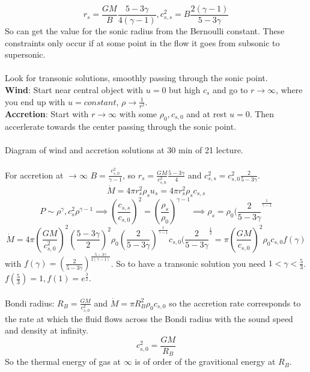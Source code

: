 \documentclass{article}
\begin{document}
$$
r_s = \frac{GM}{B} \frac{5 -3 \gamma}{4(\gamma -1)}, c_{s,s}^2 = B \frac{2(\gamma -1)}{5-3\gamma}
$$
So can get the value for the sonic radius from the Bernoulli constant. These constraints only occur if at some point in the flow it goes from subsonic to supersonic.\\\\
Look for transonic solutions, smoothly passing through the sonic point. \\
\textbf{Wind}: Start near central object with $u=0$ but high $c_s$ and go to $r\rightarrow \infty$, where you end up with $u= constant$, $\rho \rightarrow \frac{1}{r^2}$.\\
\textbf{Accretion}: Start with $r\rightarrow \infty$ with some $\rho_0, c_{s,0}$ and at rest $u=0$. Then accerlerate towards the center passing through the sonic point.\\\\
Diagram of wind and accretion solutions at 30 min of 21 lecture.\\\\
For accretion at $\rightarrow \infty$ $ B= \frac{c_{s,0}^2}{\gamma-1}$, so $r_s = \frac{GM}{c_{s,0}^2} \frac{5-3\gamma}{4}$ and $c^2_{s,s} = c^2_{s,0} \frac{2}{5-3\gamma}$.
$$
\dot M = 4\pi r^2_s \rho_s u_s = 4 \pi r_s^2 \rho_s c_{s,s}
$$
$$
P \sim \rho^{\gamma}, c_s^2 \rho^{\gamma -1} \implies (\frac{c_{s,s}}{c_{s,0}})^2  = (\frac{\rho_s}{\rho_0})^{\gamma -1} \implies \rho_s = \rho_0( \frac{2}{5-3\gamma}^\frac{1}{\gamma -1}
$$
$$
\dot M = 4 \pi (\frac{GM}{c_{s,0}^2})^2 (\frac{5-3\gamma}{2})^2 \rho_0 (\frac{2}{5-3\gamma})^{\frac{1}{\gamma-1}}c_{s,0} (\frac{2}{5-3\gamma}^{\frac{1}{2}} = \pi (\frac{GM}{c_{s,0}})^2 \rho_0 c_{s,0} f(\gamma)
$$
with $f(\gamma) = (\frac{2}{5-3\gamma})^{\frac{5-3\gamma}{2(\gamma-1)}}$. So to have a transonic solution you need $1<\gamma <\frac{5}{3}$. $f(\frac{5}{3}) = 1, f(1) = e^{\frac{3}{2}}$. \\\\
Bondi radius: $R_B = \frac{GM}{c_{s,0}^2}$ and $\dot M = \pi R_B^2 \rho_0 c_{s,0}$ so the accretion rate corresponds to the rate at which the fluid flows across the Bondi radius with the sound speed and density at infinity.
$$
c_{s,0}^2 = \frac{GM}{R_B}
$$
So the thermal energy of gas at $\infty$ is of order of the gravitional energy at $R_B$.
\end{document}
